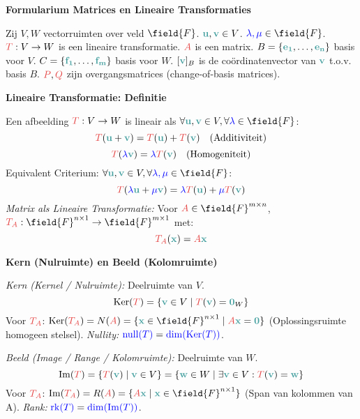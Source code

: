 \documentclass[12pt]{article}
\renewcommand{\vec}[1]{\textcolor{vectorTeal}{\mathbf{#1}}}
\newcommand{\scalar}[1]{\textcolor{scalarBrightBlue}{#1}}
\newcommand{\mat}[1]{\textcolor{matrixSoftRed}{#1}}
\DeclareMathOperator{\Ker}{Ker}
\DeclareMathOperator{\im}{Im} %
\DeclareMathOperator{\Dim}{dim}
\DeclareMathOperator{\rk}{rk}
\DeclareMathOperator{\nullity}{null}
\begin{document}
\begin{center}
\Large \textbf{Formularium Matrices en Lineaire Transformaties}
\end{center}

\vspace{1em} %

Zij $V, W$ vectorruimten over veld $\field{F}$. $\vec{u}, \vec{v} \in V$. $\scalar{\lambda, \mu} \in \field{F}$.
$\mat{T}: V \to W$ is een lineaire transformatie. $\mat{A}$ is een matrix.
$B = \{\vec{e_1}, \dots, \vec{e_n}\}$ basis voor $V$. $C = \{\vec{f_1}, \dots, \vec{f_m}\}$ basis voor $W$.
$[\vec{v}]_B$ is de coördinatenvector van $\vec{v}$ t.o.v. basis $B$.
$\mat{P}, \mat{Q}$ zijn overgangsmatrices (change-of-basis matrices).

\vspace{1.5em} %
{\centering
\textcolor{headerBrown}{\large\textbf{Lineaire Transformatie: Definitie}}
\par
}%
Een afbeelding $\mat{T}: V \to W$ is lineair als $\forall \vec{u}, \vec{v} \in V, \forall \scalar{\lambda} \in \field{F}$:
\[
\mat{T}(\vec{u} + \vec{v}) = \mat{T}(\vec{u}) + \mat{T}(\vec{v}) \quad \text{(Additiviteit)}
\]
\[
\mat{T}(\scalar{\lambda} \vec{v}) = \scalar{\lambda} \mat{T}(\vec{v}) \quad \text{(Homogeniteit)}
\]
Equivalent Criterium: $\forall \vec{u}, \vec{v} \in V, \forall \scalar{\lambda, \mu} \in \field{F}$:
\[
\mat{T}(\scalar{\lambda}\vec{u} + \scalar{\mu}\vec{v}) = \scalar{\lambda} \mat{T}(\vec{u}) + \scalar{\mu} \mat{T}(\vec{v})
\]
\textit{Matrix als Lineaire Transformatie:} Voor $\mat{A} \in \field{F}^{m \times n}$, $\mat{T_A}: \field{F}^{n \times 1} \to \field{F}^{m \times 1}$ met:
\[
\mat{T_A}(\vec{x}) = \mat{A} \vec{x}
\]

\vspace{1.5em} %
{\centering
\textcolor{headerBrown}{\large\textbf{Kern (Nulruimte) en Beeld (Kolomruimte)}}
\par
}%
\textit{Kern (Kernel / Nulruimte):} Deelruimte van $V$.
\[
\Ker(\mat{T}) = \{ \vec{v} \in V \mid \mat{T}(\vec{v}) = \vec{0}_W \}
\]
Voor $\mat{T_A}$: $\Ker(\mat{T_A}) = N(\mat{A}) = \{ \vec{x} \in \field{F}^{n \times 1} \mid \mat{A} \vec{x} = \vec{0} \}$ (Oplossingsruimte homogeen stelsel).
\textit{Nullity:} $\scalar{\nullity(T)} = \scalar{\Dim(\Ker(T))}$.

\textit{Beeld (Image / Range / Kolomruimte):} Deelruimte van $W$.
\[
\im(\mat{T}) = \{ \mat{T}(\vec{v}) \mid \vec{v} \in V \} = \{ \vec{w} \in W \mid \exists \vec{v} \in V: \mat{T}(\vec{v}) = \vec{w} \}
\]
Voor $\mat{T_A}$: $\im(\mat{T_A}) = R(\mat{A}) = \{ \mat{A} \vec{x} \mid \vec{x} \in \field{F}^{n \times 1} \}$ (Span van kolommen van A).
\textit{Rank:} $\scalar{\rk(T)} = \scalar{\Dim(\im(T))}$.
\end{document}
